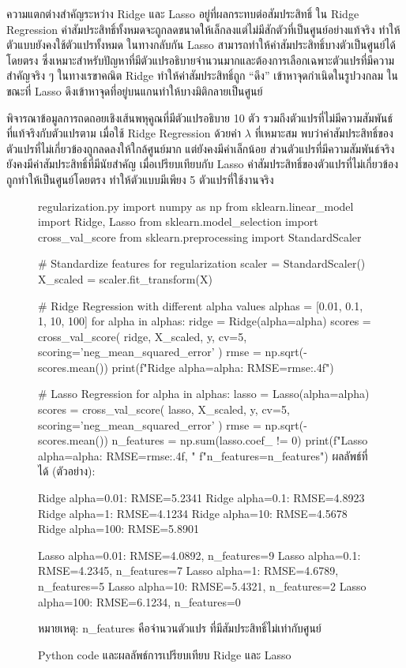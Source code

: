 ความแตกต่างสำคัญระหว่าง Ridge และ Lasso อยู่ที่ผลกระทบต่อสัมประสิทธิ์ ใน Ridge Regression ค่าสัมประสิทธิ์ทั้งหมดจะถูกลดขนาดให้เล็กลงแต่ไม่มีสักตัวที่เป็นศูนย์อย่างแท้จริง ทำให้ตัวแบบยังคงใช้ตัวแปรทั้งหมด ในทางกลับกัน Lasso สามารถทำให้ค่าสัมประสิทธิ์บางตัวเป็นศูนย์ได้โดยตรง ซึ่งเหมาะสำหรับปัญหาที่มีตัวแปรอธิบายจำนวนมากและต้องการเลือกเฉพาะตัวแปรที่มีความสำคัญจริง ๆ ในทางเรขาคณิต Ridge ทำให้ค่าสัมประสิทธิ์ถูก ``ดึง'' เข้าหาจุดกำเนิดในรูปวงกลม ในขณะที่ Lasso ดึงเข้าหาจุดที่อยู่บนแกนทำให้บางมิติกลายเป็นศูนย์

\begin{exmp}
พิจารณาข้อมูลการถดถอยเชิงเส้นพหุคูณที่มีตัวแปรอธิบาย 10 ตัว รวมถึงตัวแปรที่ไม่มีความสัมพันธ์ที่แท้จริงกับตัวแปรตาม เมื่อใช้ Ridge Regression ด้วยค่า $\lambda$ ที่เหมาะสม พบว่าค่าสัมประสิทธิ์ของตัวแปรที่ไม่เกี่ยวข้องถูกลดลงให้ใกล้ศูนย์มาก แต่ยังคงมีค่าเล็กน้อย ส่วนตัวแปรที่มีความสัมพันธ์จริงยังคงมีค่าสัมประสิทธิ์ที่มีนัยสำคัญ เมื่อเปรียบเทียบกับ Lasso ค่าสัมประสิทธิ์ของตัวแปรที่ไม่เกี่ยวข้องถูกทำให้เป็นศูนย์โดยตรง ทำให้ตัวแบบมีเพียง 5 ตัวแปรที่ใช้งานจริง
\end{exmp}

\begin{figure}[h]
\begin{pycode}{regularization.py}
import numpy as np
from sklearn.linear_model import Ridge, Lasso
from sklearn.model_selection import cross_val_score
from sklearn.preprocessing import StandardScaler

# Standardize features for regularization
scaler = StandardScaler()
X_scaled = scaler.fit_transform(X)

# Ridge Regression with different alpha values
alphas = [0.01, 0.1, 1, 10, 100]
for alpha in alphas:
    ridge = Ridge(alpha=alpha)
    scores = cross_val_score(
        ridge, X_scaled, y, cv=5,
        scoring='neg_mean_squared_error'
    )
    rmse = np.sqrt(-scores.mean())
    print(f"Ridge alpha={alpha}: RMSE={rmse:.4f}")

# Lasso Regression
for alpha in alphas:
    lasso = Lasso(alpha=alpha)
    scores = cross_val_score(
        lasso, X_scaled, y, cv=5,
        scoring='neg_mean_squared_error'
    )
    rmse = np.sqrt(-scores.mean())
    n_features = np.sum(lasso.coef_ != 0)
    print(f"Lasso alpha={alpha}: RMSE={rmse:.4f}, "
          f"n_features={n_features}")
\tcblower
ผลลัพธ์ที่ได้ (ตัวอย่าง):

Ridge alpha=0.01: RMSE=5.2341
Ridge alpha=0.1: RMSE=4.8923
Ridge alpha=1: RMSE=4.1234
Ridge alpha=10: RMSE=4.5678
Ridge alpha=100: RMSE=5.8901

Lasso alpha=0.01: RMSE=4.0892, n\_features=9
Lasso alpha=0.1: RMSE=4.2345, n\_features=7
Lasso alpha=1: RMSE=4.6789, n\_features=5
Lasso alpha=10: RMSE=5.4321, n\_features=2
Lasso alpha=100: RMSE=6.1234, n\_features=0

หมายเหตุ: n\_features คือจำนวนตัวแปร
ที่มีสัมประสิทธิ์ไม่เท่ากับศูนย์
\end{pycode}
\caption{Python code และผลลัพธ์การเปรียบเทียบ Ridge และ Lasso}
\label{fig:regularization_code}
\end{figure}


